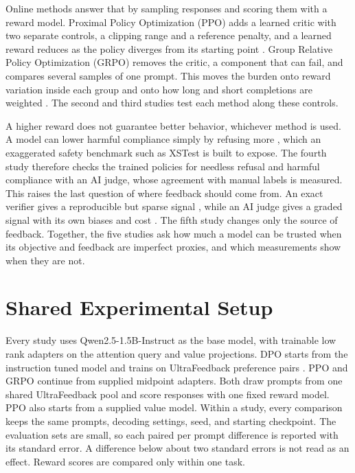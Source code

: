 \documentclass{article}
\begin{document}
Online methods answer that by sampling responses and scoring them with a reward
model. Proximal Policy Optimization (PPO)
\citep{schulman2017proximal} adds a learned critic with two separate controls, a
clipping range and a reference penalty, and a learned reward reduces as the
policy diverges from its starting point \citep{gao2023scaling}. Group Relative
Policy Optimization (GRPO) \citep{shao2024deepseekmath} removes the critic, a
component that can fail, and compares several samples of one prompt. This moves
the burden onto reward variation inside each group and onto how long and short
completions are weighted \citep{liu2025understanding}. The second and third
studies test each method along these controls.

A higher reward does not guarantee better behavior, whichever method is used. A
model can lower harmful compliance simply by refusing more
\citep{bianchi2024safetytuned}, which an exaggerated safety benchmark such as
XSTest \citep{rottger2024xstest} is built to expose. The fourth study therefore
checks the trained policies for needless refusal and harmful compliance with an
AI judge, whose agreement with manual labels is measured. This raises the last
question of where feedback should come from. An exact verifier gives a
reproducible but sparse signal \citep{deepseekai2025r1}, while an AI judge gives
a graded signal with its own biases and cost
\citep{lee2024rlaif,bai2022constitutional,zheng2023judging}. The fifth study
changes only the source of feedback. Together, the five studies ask how much a
model can be trusted when its objective and feedback are imperfect proxies, and
which measurements show when they are not.

\section{Shared Experimental Setup}
\label{sec:setup}

Every study uses Qwen2.5-1.5B-Instruct \citep{qwen2024qwen25} as the base model,
with trainable low rank adapters \citep{hu2022lora} on the attention query and
value projections. DPO starts from the instruction tuned model and trains on
UltraFeedback preference pairs \citep{cui2024ultrafeedback}. PPO and GRPO
continue from supplied midpoint adapters. Both draw prompts from one shared
UltraFeedback pool and score responses with one fixed reward model. PPO also
starts from a supplied value model. Within a study, every comparison keeps the
same prompts, decoding settings, seed, and starting checkpoint. The evaluation
sets are small, so each paired per prompt difference is reported with its
standard error. A difference below about two standard errors is not read as an
effect. Reward scores are compared only within one task.
\end{document}
